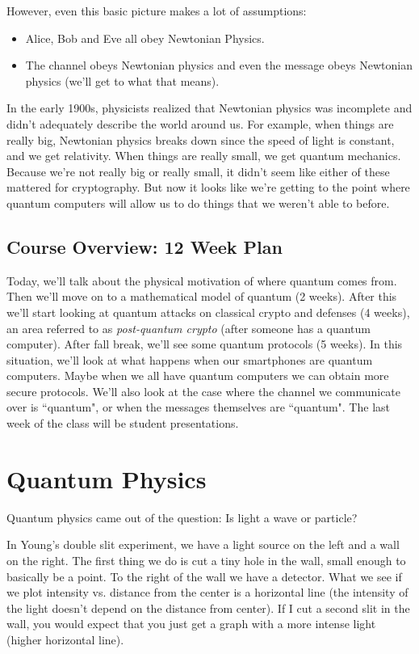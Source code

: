 However, even this basic picture makes a lot of assumptions:
\begin{itemize}
\item Alice, Bob and Eve all obey Newtonian Physics.
\item The channel obeys Newtonian physics and even the message obeys Newtonian physics (we'll get to what that means).
\end{itemize}

In the early 1900s, physicists realized that Newtonian physics was incomplete and didn't adequately describe the world around us. For example, when things are really big, Newtonian physics breaks down since the speed of light is constant, and we get relativity. When things are really small, we get quantum mechanics. Because we're not really big or really small, it didn't seem like either of these mattered for cryptography. But now it looks like we're getting to the point where quantum computers will allow us to do things that we weren't able to before.

\subsection{Course Overview: 12 Week Plan} Today, we'll talk about the physical motivation of where quantum comes from. Then we'll move on to a mathematical model of quantum (2 weeks). After this we'll start looking at quantum attacks on classical crypto and defenses (4 weeks), an area referred to as \emph{post-quantum crypto} (after someone has a quantum computer). After fall break, we'll see some quantum protocols (5 weeks). In this situation, we'll look at what happens when our smartphones are quantum computers. Maybe when we all have quantum computers we can obtain more secure protocols. We'll also look at the case where the channel we communicate over is ``quantum", or when the messages themselves are ``quantum". The last week of the class will be student presentations.

\section{Quantum Physics}

Quantum physics came out of the question: Is light a wave or particle?

In Young's double slit experiment, we have a light source on the left and a wall on the right. The first thing we do is cut a tiny hole in the wall, small enough to basically be a point. To the right of the wall we have a detector. What we see if we plot intensity vs. distance from the center is a horizontal line (the intensity of the light doesn't depend on the distance from center). If I cut a second slit in the wall, you would expect that you just get a graph with a more intense light (higher horizontal line).

